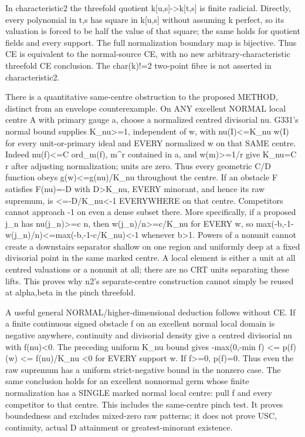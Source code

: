 \documentclass[11pt]{article}
\begin{document}
In characteristic2 the threefold quotient k[u,s]-\textgreater{}k[t,s] is finite radicial. Directly, every polynomial in t,s has square in k[u,s] without assuming k perfect, so its valuation is forced to be half the value of that square; the same holds for quotient fields and every support. The full normalization boundary map is bijective. Thus CE is equivalent to the normal-source CE, with no new arbitrary-characteristic threefold CE conclusion. The char(k)!=2 two-point fibre is not asserted in characteristic2.

There is a quantitative same-centre obstruction to the proposed METHOD, distinct from an envelope counterexample. On ANY excellent NORMAL local centre A with primary gauge a, choose a normalized centred divisorial nu. G331's normal bound supplies K\_nu\textgreater{}=1, independent of w, with nu(I)\textless{}=K\_nu w(I) for every unit-or-primary ideal and EVERY normalized w on that SAME centre. Indeed nu(f)\textless{}=C ord\_m(f), m\textasciicircum{}r contained in a, and w(m)\textgreater{}=1/r give K\_nu=C r after adjusting normalization; units are zero. Thus every geometric C/D function obeys g(w)\textless{}=g(nu)/K\_nu throughout the centre. If an obstacle F satisfies F(nu)=-D with D\textgreater{}K\_nu, EVERY minorant, and hence its raw supremum, is \textless{}=-D/K\_nu\textless{}-1 EVERYWHERE on that centre. Competitors cannot approach -1 on even a dense subset there. More specifically, if a proposed j\_n has nu(j\_n)\textgreater{}=c n, then w(j\_n)/n\textgreater{}=c/K\_nu for EVERY w, so max(-b,-1-w(j\_n)/n)\textless{}=max(-b,-1-c/K\_nu)\textless{}-1 whenever b\textgreater{}1. Powers of a nonunit cannot create a downstairs separator shallow on one region and uniformly deep at a fixed divisorial point in the same marked centre. A local element is either a unit at all centred valuations or a nonunit at all; there are no CRT units separating these lifts. This proves why n2's separate-centre construction cannot simply be reused at alpha,beta in the pinch threefold.

A useful general NORMAL/higher-dimensional deduction follows without CE. If a finite continuous signed obstacle f on an excellent normal local domain is negative anywhere, continuity and divisorial density give a centred divisorial nu with f(nu)\textless{}0. The preceding uniform K\_nu bound gives
-max(0,-min f) \textless{}= p(f)(w) \textless{}= f(nu)/K\_nu \textless{}0 for EVERY support w.
If f\textgreater{}=0, p(f)=0. Thus even the raw supremum has a uniform strict-negative bound in the nonzero case. The same conclusion holds for an excellent nonnormal germ whose finite normalization has a SINGLE marked normal local centre: pull f and every competitor to that centre. This includes the same-centre pinch test. It proves boundedness and excludes mixed-zero raw patterns; it does not prove USC, continuity, actual D attainment or greatest-minorant existence.
\end{document}
